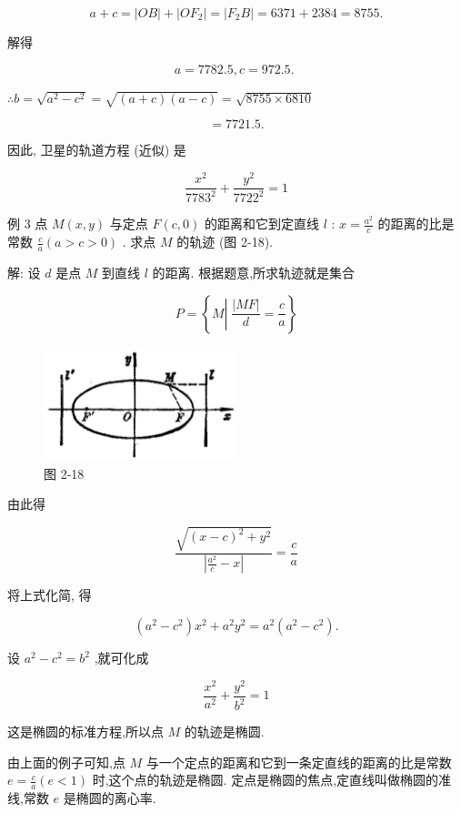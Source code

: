 \documentclass[lang=cn,newtx,12pt,scheme=chinese]{elegantbook}
\begin{document}
\[
  a + c = \left| {OB}\right| + \left| {O{F}_{2}}\right| = \left| {{F}_{2}B}\right| = {6371} + {2384} = {8755}.
\]

解得

\[
  a = {7782.5},c = {972.5}\text{. }
\]

\(\therefore b = \sqrt{{a}^{2} - {c}^{2}} = \sqrt{\left( {a + c}\right) \left( {a - c}\right) } = \sqrt{{8755} \times {6810}}\)

\[
  = {7721.5}\text{.}
\]

因此, 卫星的轨道方程 (近似) 是

\[
  \frac{{x}^{2}}{{7783}^{2}} + \frac{{y}^{2}}{{7722}^{2}} = 1
\]

例 3 点 \(M\left( {x,y}\right)\) 与定点 \(F\left( {c,0}\right)\) 的距离和它到定直线 \(l\) : \(x = \frac{{a}^{2}}{c}\) 的距离的比是常数 \(\frac{c}{a}\left( {a > c > 0}\right)\) . 求点 \(M\) 的轨迹 (图 2-18).

解: 设 \(d\) 是点 \(M\) 到直线 \(l\) 的距离. 根据题意,所求轨迹就是集合

\[
  P = \left\{ {M\left| {\;\frac{\left| MF\right| }{d} = \frac{c}{a}}\right. }\right\}
\]

\begin{figure}[h]
  \centering
  \includegraphics[max width=0.5\textwidth]{images/01912cc2-ffb6-728e-9ae7-b113ff05c64b_93_181051.jpg}
  \caption{图 2-18}
\end{figure}

由此得

\[
  \frac{\sqrt{{\left( x - c\right) }^{2} + {y}^{2}}}{\left| \frac{{a}^{2}}{c} - x\right| } = \frac{c}{a}
\]

将上式化简, 得

\[
  \left( {{a}^{2} - {c}^{2}}\right) {x}^{2} + {a}^{2}{y}^{2} = {a}^{2}\left( {{a}^{2} - {c}^{2}}\right) .
\]

设 \({a}^{2} - {c}^{2} = {b}^{2}\) ,就可化成

\[
  \frac{{x}^{2}}{{a}^{2}} + \frac{{y}^{2}}{{b}^{2}} = 1
\]

这是椭圆的标准方程,所以点 \(M\) 的轨迹是椭圆.

由上面的例子可知,点 \(M\) 与一个定点的距离和它到一条定直线的距离的比是常数 \(e = \frac{c}{a}\left( {e < 1}\right)\) 时,这个点的轨迹是椭圆. 定点是椭圆的焦点,定直线叫做椭圆的准线,常数 \(e\) 是椭圆的离心率.
\end{document}
